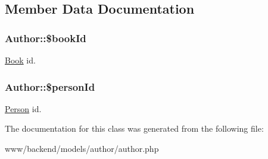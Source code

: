 \subsection{Member Data Documentation}
\hypertarget{classAuthor_a6d4bc8d9eae2f9d89654bece0c0f9522}{
\subsubsection[{\$bookId}]{\setlength{\rightskip}{0pt plus 5cm}Author::\$bookId}}
\label{classAuthor_a6d4bc8d9eae2f9d89654bece0c0f9522}
\hyperlink{classBook}{Book} id. \hypertarget{classAuthor_a628d54cd75c03cfe5c48c38fbabaf391}{
\subsubsection[{\$personId}]{\setlength{\rightskip}{0pt plus 5cm}Author::\$personId}}
\label{classAuthor_a628d54cd75c03cfe5c48c38fbabaf391}
\hyperlink{classPerson}{Person} id. 

The documentation for this class was generated from the following file:\begin{DoxyCompactItemize}
\item 
www/backend/models/author/author.php\end{DoxyCompactItemize}
